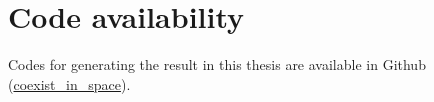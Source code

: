 \documentclass[12pt]{article}
\begin{document}
\newpage


\newpage




\newpage

\clearpage
{}
{}
 



\section*{Code availability}
{}
Codes for generating the result in this thesis are available in Github (\href{https://github.com/Yun-yin/coexist_in_space}{coexist\_in\_space}).


\newpage

\appendix
{}
\clearpage
\setcounter{page}{1}
\renewcommand{\thepage}{A-\arabic{page}}
\renewcommand{\thefigure}{S.\arabic{figure}}
\setcounter{figure}{0}









\clearpage
{}
{}


\end{document}

